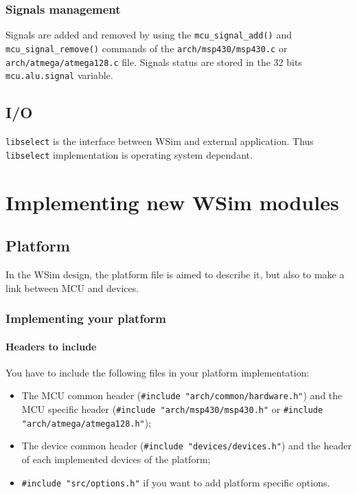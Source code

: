 \documentclass[a4paper,10pt]{report}
\begin{document}
\subsection{Signals management}
Signals are added and removed by using the \verb$mcu_signal_add()$ and \verb$mcu_signal_remove()$ commands of the \verb$arch/msp430/msp430.c$ or \verb$arch/atmega/atmega128.c$ file.
Signals status are stored in the 32 bits \verb$mcu.alu.signal$ variable.



\section{I/O}
\verb$libselect$ is the interface between WSim and external application. Thus \verb$libselect$ implementation is operating system dependant.

\chapter{Implementing new WSim modules}

\section{Platform}
In the WSim design, the platform file is aimed to describe it, but also to make a link between MCU and devices.
\subsection{Implementing your platform}
\subsubsection{Headers to include}
You have to include the following files in your platform implementation:
\begin{itemize}
  \item The MCU common header (\verb$#include "arch/common/hardware.h"$) and the MCU specific header (\verb$#include "arch/msp430/msp430.h"$ or \verb$#include "arch/atmega/atmega128.h"$);
  \item The device common header (\verb$#include "devices/devices.h"$) and the header of each implemented devices of the platform;
  \item \verb$#include "src/options.h"$ if you want to add platform specific options.
\end{itemize}
\end{document}
